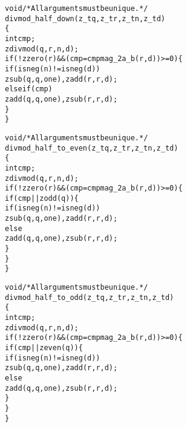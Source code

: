 \begin{alltt}
   void \textcolor{c}{/* \textrm{All arguments must be unique.} */}
   divmod_half_down(z_t q, z_t r, z_t n, z_t d)
   \{
       int cmp;
       zdivmod(q, r, n, d);
       if (!zzero(r) && (cmp = cmpmag_2a_b(r, d)) >= 0) \{
           if (isneg(n) != isneg(d))
               zsub(q, q, one), zadd(r, r, d);
           else if (cmp)
               zadd(q, q, one), zsub(r, r, d);
       \}
   \}
\end{alltt}

\begin{alltt}
   void \textcolor{c}{/* \textrm{All arguments must be unique.} */}
   divmod_half_to_even(z_t q, z_t r, z_t n, z_t d)
   \{
       int cmp;
       zdivmod(q, r, n, d);
       if (!zzero(r) && (cmp = cmpmag_2a_b(r, d)) >= 0) \{
           if (cmp || zodd(q)) \{
               if (isneg(n) != isneg(d))
                   zsub(q, q, one), zadd(r, r, d);
               else
                   zadd(q, q, one), zsub(r, r, d);
           \}
       \}
   \}
\end{alltt}

\newpage
\begin{alltt}
   void \textcolor{c}{/* \textrm{All arguments must be unique.} */}
   divmod_half_to_odd(z_t q, z_t r, z_t n, z_t d)
   \{
       int cmp;
       zdivmod(q, r, n, d);
       if (!zzero(r) && (cmp = cmpmag_2a_b(r, d)) >= 0) \{
           if (cmp || zeven(q)) \{
               if (isneg(n) != isneg(d))
                   zsub(q, q, one), zadd(r, r, d);
               else
                   zadd(q, q, one), zsub(r, r, d);
           \}
       \}
   \}
\end{alltt}


